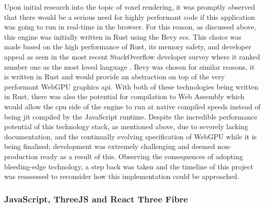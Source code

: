 \documentclass[titlepage]{article}
\begin{document}
Upon initial research into the topic of voxel rendering, it was promptly observed that there would be a serious need for highly performant code if this application was going to run in real-time in the browser. For this reason, as discussed above, this engine was initially written in Rust using the Bevy \gls{ecs}. This choice was made based on the high performance of Rust, its memory safety, and developer appeal as seen in the most recent StackOverflow developer survey where it ranked number one as the most loved language \cite{survey}. Bevy was chosen for similar reasons, it is written in Rust and would provide an abstraction on top of the very performant WebGPU graphics \gls{api}. With both of these technologies being written in Rust, there was also the potential for compilation to Web Assembly which would allow the \gls{cpu} side of the engine to run at native compiled speeds instead of being \gls{jit} compiled by the JavaScript runtime. Despite the incredible performance potential of this technology stack, as mentioned above, due to severely lacking documentation, and the continually evolving specification of WebGPU while it is being finalised; development was extremely challenging and deemed non-production ready as a result of this. Observing the consequences of adopting bleeding-edge technology, a step back was taken and the timeline of this project was reassessed to reconsider how this implementation could be approached.

\subsubsection{JavaScript, ThreeJS and React Three Fibre}
\end{document}
